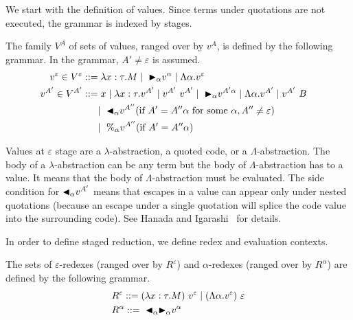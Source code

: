 We start with the definition of values. Since terms under quotations are
not executed, the grammar is indexed by stages.

\begin{definition}[Values]
  The family $V^A$ of sets of values, ranged over by $v^A$,
  is defined by the following grammar.  In the grammar, $A' \neq \varepsilon$ is assumed.
  \begin{align*}
    v^\varepsilon \in V^\varepsilon & ::= \lambda x:\tau.M \mid\ {\mathop{\blacktriangleright}}_\alpha v^\alpha \mid \Lambda\alpha.v^\varepsilon                                             & \\
    v^{A'} \in V^{A'}               & ::= x \mid \lambda x:\tau.v^{A'} \mid v^{A'}\ v^{A'} \mid\ {\mathop{\blacktriangleright}}_\alpha v^{A'\alpha} \mid \Lambda\alpha.v^{A'} \mid v^{A'}\ B & \\
                                    & \quad\   \mid\ {\mathop{\blacktriangleleft}}_\alpha v^{A''} (\text{if } A' = A''\alpha \text{ for some } \alpha, A'' \neq \varepsilon)               & \\
                                    & \quad\   \mid\ \%_\alpha v^{A''} (\text{if } A' = A''\alpha)
  \end{align*}
\end{definition}

Values at $\varepsilon$ stage are a $\lambda$-abstraction, a quoted code,
or a $\Lambda$-abstraction.  The body of a $\lambda$-abstraction can
be any term but the body of $\Lambda$-abstraction has to a value.  It
means that the body of $\Lambda$-abstraction must be evaluated.  The
side condition for ${\mathop{\blacktriangleleft}}_\alpha v^{A'}$ means that escapes in a value
can appear only under nested quotations (because an escape under a
single quotation will splice the code value into the surrounding
code).  See Hanada and Igarashi~\cite{Hanada2014} for details.

In order to define staged reduction, we define redex and evaluation contexts.

\begin{definition}[Redex]
  The sets of $\varepsilon$-redexes (ranged over by $R^\varepsilon$) and $\alpha$-redexes (ranged over by $R^\alpha$) are defined by the following grammar.
  \begin{align*}
     & R^\varepsilon ::= (\lambda x:\tau.M)\ v^\varepsilon \mid (\Lambda\alpha.v^\varepsilon)\ \varepsilon \\
     & R^\alpha      ::=\ {\mathop{\blacktriangleleft}}_\alpha {\mathop{\blacktriangleright}}_\alpha v^\alpha                                                         \\
  \end{align*}
\end{definition}

